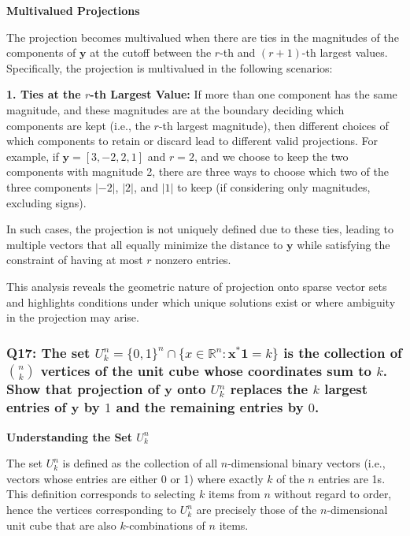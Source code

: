 \documentclass[8pt]{article}
\begin{document}
{\textbf{Multivalued Projections}

The projection becomes multivalued when there are ties in the magnitudes of the components of \(\mathbf{y}\) at the cutoff between the \(r\)-th and \((r+1)\)-th largest values. Specifically, the projection is multivalued in the following scenarios:

\textbf{1. Ties at the \(r\)-th Largest Value:}
   If more than one component has the same magnitude, and these magnitudes are at the boundary deciding which components are kept (i.e., the \(r\)-th largest magnitude), then different choices of which components to retain or discard lead to different valid projections. For example, if \(\mathbf{y} = [3, -2, 2, 1]\) and \(r = 2\), and we choose to keep the two components with magnitude 2, there are three ways to choose which two of the three components \(|-2|\), \(|2|\), and \(|1|\) to keep (if considering only magnitudes, excluding signs).

In such cases, the projection is not uniquely defined due to these ties, leading to multiple vectors that all equally minimize the distance to \(\mathbf{y}\) while satisfying the constraint of having at most \(r\) nonzero entries.

This analysis reveals the geometric nature of projection onto sparse vector sets and highlights conditions under which unique solutions exist or where ambiguity in the projection may arise.

\subsubsection*{Q17: The set \(U_k^n = \{0,1\}^n \cap \{x \in \mathbb{R}^n : \mathbf{x}^* \mathbf{1} = k\}\) is the collection of \(\binom{n}{k}\) vertices of the unit cube whose coordinates sum to \(k\). Show that projection of \(\mathbf{y}\) onto \(U_k^n\) replaces the \(k\) largest entries of \(\mathbf{y}\) by \(1\) and the remaining entries by \(0\).}

\textbf{Understanding the Set \( U_k^n \)}

The set \( U_k^n \) is defined as the collection of all \(n\)-dimensional binary vectors (i.e., vectors whose entries are either 0 or 1) where exactly \(k\) of the \(n\) entries are 1s. This definition corresponds to selecting \(k\) items from \(n\) without regard to order, hence the vertices corresponding to \( U_k^n \) are precisely those of the \(n\)-dimensional unit cube that are also \(k\)-combinations of \(n\) items.

}
\end{document}
